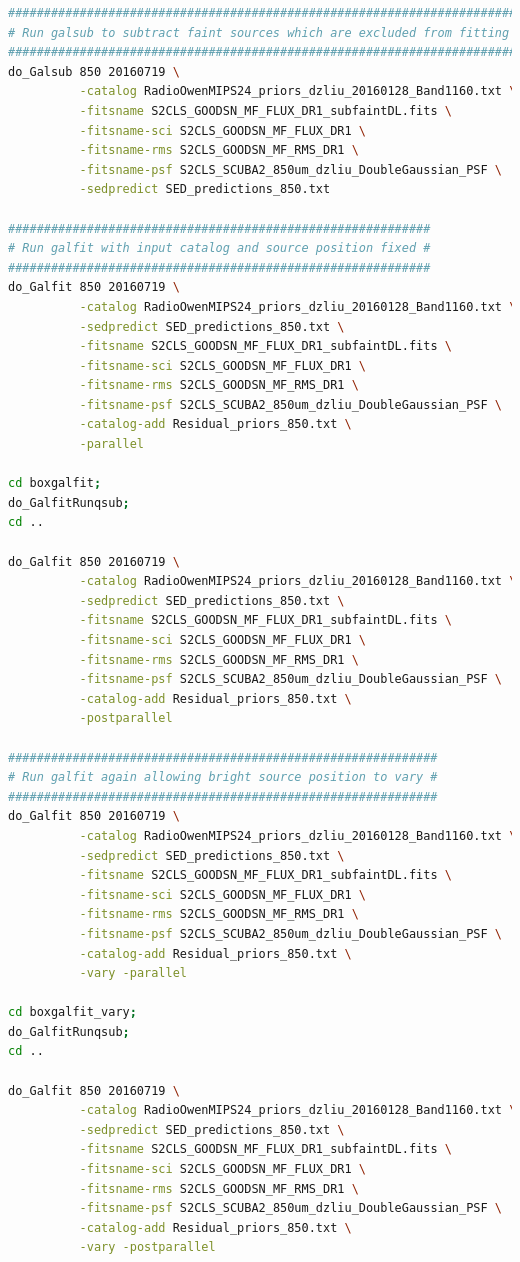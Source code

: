 \documentclass[11pt,a4paper]{article}
\begin{document}
\begin{lstlisting}[language=bash]
########################################################################
# Run galsub to subtract faint sources which are excluded from fitting #
########################################################################
do_Galsub 850 20160719 \
          -catalog RadioOwenMIPS24_priors_dzliu_20160128_Band1160.txt \
          -fitsname S2CLS_GOODSN_MF_FLUX_DR1_subfaintDL.fits \
          -fitsname-sci S2CLS_GOODSN_MF_FLUX_DR1 \
          -fitsname-rms S2CLS_GOODSN_MF_RMS_DR1 \
          -fitsname-psf S2CLS_SCUBA2_850um_dzliu_DoubleGaussian_PSF \
          -sedpredict SED_predictions_850.txt

###########################################################
# Run galfit with input catalog and source position fixed #
###########################################################
do_Galfit 850 20160719 \
          -catalog RadioOwenMIPS24_priors_dzliu_20160128_Band1160.txt \
          -sedpredict SED_predictions_850.txt \
          -fitsname S2CLS_GOODSN_MF_FLUX_DR1_subfaintDL.fits \
          -fitsname-sci S2CLS_GOODSN_MF_FLUX_DR1 \
          -fitsname-rms S2CLS_GOODSN_MF_RMS_DR1 \
          -fitsname-psf S2CLS_SCUBA2_850um_dzliu_DoubleGaussian_PSF \
          -catalog-add Residual_priors_850.txt \
          -parallel

cd boxgalfit;
do_GalfitRunqsub;
cd ..

do_Galfit 850 20160719 \
          -catalog RadioOwenMIPS24_priors_dzliu_20160128_Band1160.txt \
          -sedpredict SED_predictions_850.txt \
          -fitsname S2CLS_GOODSN_MF_FLUX_DR1_subfaintDL.fits \
          -fitsname-sci S2CLS_GOODSN_MF_FLUX_DR1 \
          -fitsname-rms S2CLS_GOODSN_MF_RMS_DR1 \
          -fitsname-psf S2CLS_SCUBA2_850um_dzliu_DoubleGaussian_PSF \
          -catalog-add Residual_priors_850.txt \
          -postparallel

############################################################
# Run galfit again allowing bright source position to vary #
############################################################
do_Galfit 850 20160719 \
          -catalog RadioOwenMIPS24_priors_dzliu_20160128_Band1160.txt \
          -sedpredict SED_predictions_850.txt \
          -fitsname S2CLS_GOODSN_MF_FLUX_DR1_subfaintDL.fits \
          -fitsname-sci S2CLS_GOODSN_MF_FLUX_DR1 \
          -fitsname-rms S2CLS_GOODSN_MF_RMS_DR1 \
          -fitsname-psf S2CLS_SCUBA2_850um_dzliu_DoubleGaussian_PSF \
          -catalog-add Residual_priors_850.txt \
          -vary -parallel

cd boxgalfit_vary;
do_GalfitRunqsub;
cd ..

do_Galfit 850 20160719 \
          -catalog RadioOwenMIPS24_priors_dzliu_20160128_Band1160.txt \
          -sedpredict SED_predictions_850.txt \
          -fitsname S2CLS_GOODSN_MF_FLUX_DR1_subfaintDL.fits \
          -fitsname-sci S2CLS_GOODSN_MF_FLUX_DR1 \
          -fitsname-rms S2CLS_GOODSN_MF_RMS_DR1 \
          -fitsname-psf S2CLS_SCUBA2_850um_dzliu_DoubleGaussian_PSF \
          -catalog-add Residual_priors_850.txt \
          -vary -postparallel
\end{lstlisting}
\end{document}
